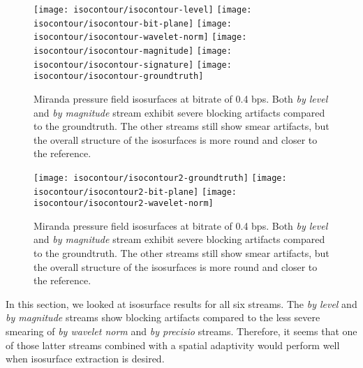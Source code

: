 \begin{figure}[t]
	\centering
	{\texttt{[image: isocontour/isocontour-level]}}
	{\texttt{[image: isocontour/isocontour-bit-plane]}}
	{\texttt{[image: isocontour/isocontour-wavelet-norm]}}
	{\texttt{[image: isocontour/isocontour-magnitude]}}
	{\texttt{[image: isocontour/isocontour-signature]}}
	{\texttt{[image: isocontour/isocontour-groundtruth]}}
	\caption{Miranda pressure field isosurfaces at bitrate of 0.4 bps. Both {\em by level}
        and {\em by magnitude} stream exhibit severe blocking artifacts compared to the groundtruth.
        The other streams still show smear artifacts, but the overall structure of the isosurfaces
        is more round and closer to the reference.}
	\label{fig:isocontour-surfaces}
\end{figure}

\begin{figure}[t]
	\centering
	{\texttt{[image: isocontour/isocontour2-groundtruth]}}
	{\texttt{[image: isocontour/isocontour2-bit-plane]}}
	{\texttt{[image: isocontour/isocontour2-wavelet-norm]}}
	\caption{Miranda pressure field isosurfaces at bitrate of 0.4 bps. Both {\em by level}
        and {\em by magnitude} stream exhibit severe blocking artifacts compared to the groundtruth.
        The other streams still show smear artifacts, but the overall structure of the isosurfaces
        is more round and closer to the reference.}
	\label{fig:isocontour-surfaces}
\end{figure}


In this section, we looked at isosurface results for all six streams. The {\em by level} and {\em by
magnitude} streams show blocking artifacts compared to the less severe smearing of {\em by wavelet
norm} and {\em by precisio} streams. Therefore, it seems that one of those latter streams combined
with a spatial adaptivity would perform well when isosurface extraction is desired.

